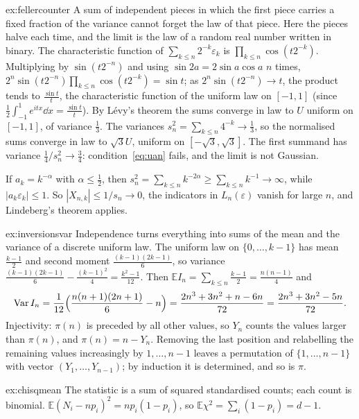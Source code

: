 \begin{solution}{ex:fellercounter}
\idea A sum of independent pieces in which the first piece carries a fixed fraction of the variance cannot forget the law of that piece. Here the
pieces halve each time, and the limit is the law of a random real number written in binary.
\writeup The characteristic function of $\sum_{k\le n}2^{-k}\varepsilon_k$ is $\prod_{k\le n}\cos(t2^{-k})$. Multiplying by $\sin(t2^{-n})$ and using
$\sin2a=2\sin a\cos a$ $n$ times, $2^n\sin(t2^{-n})\prod_{k\le n}\cos(t2^{-k})=\sin t$; as $2^n\sin(t2^{-n})\to t$, the product tends to $\frac{\sin t}t$, the characteristic
function of the uniform law on $[-1,1]$ (since $\frac12\int_{-1}^1e^{itx}\dd x=\frac{\sin t}t$). By L\'evy's theorem the sums converge in law to $U$ uniform on
$[-1,1]$, of variance $\frac13$. The variances $s_n^2=\sum_{k\le n}4^{-k}\to\frac13$, so the normalised sums converge in law to $\sqrt3U$, uniform on $[-\sqrt3,\sqrt3]$.
The first summand has variance $\frac14/s_n^2\to\frac34$: condition~\eqref{eq:uan} fails, and the limit is not Gaussian.

If $a_k=k^{-\alpha}$ with $\alpha\le\frac12$, then $s_n^2=\sum_{k\le n}k^{-2\alpha}\ge\sum_{k\le n}k^{-1}\to\infty$, while $|a_k\varepsilon_k|\le1$. So $|X_{n,k}|\le1/s_n\to0$, the
indicators in $L_n(\varepsilon)$ vanish for large $n$, and Lindeberg's theorem applies.
\end{solution}

\begin{solution}{ex:inversionsvar}
\idea Independence turns everything into sums of the mean and the variance of a discrete uniform law.
\writeup The uniform law on $\{0,\dots,k-1\}$ has mean $\frac{k-1}2$ and second moment $\frac{(k-1)(2k-1)}6$, so variance $\frac{(k-1)(2k-1)}6-\frac{(k-1)^2}4=\frac{k^2-1}{12}$.
Then $\mathbb EI_n=\sum_{k\le n}\frac{k-1}2=\frac{n(n-1)}4$ and
\[
\operatorname{Var}I_n=\frac1{12}\Bigl(\frac{n(n+1)(2n+1)}6-n\Bigr)=\frac{2n^3+3n^2+n-6n}{72}=\frac{2n^3+3n^2-5n}{72}.
\]
Injectivity: $\pi(n)$ is preceded by all other values, so $Y_n$ counts the values larger than $\pi(n)$, and $\pi(n)=n-Y_n$. Removing the last position
and relabelling the remaining values increasingly by $1,\dots,n-1$ leaves a permutation of $\{1,\dots,n-1\}$ with vector $(Y_1,\dots,Y_{n-1})$; by
induction it is determined, and so is $\pi$.
\end{solution}

\begin{solution}{ex:chisqmean}
\idea The statistic is a sum of squared standardised counts; each count is binomial.
\writeup $\mathbb E(N_i-np_i)^2=np_i(1-p_i)$, so $\mathbb E\chi^2=\sum_i(1-p_i)=d-1$.
\end{solution}

